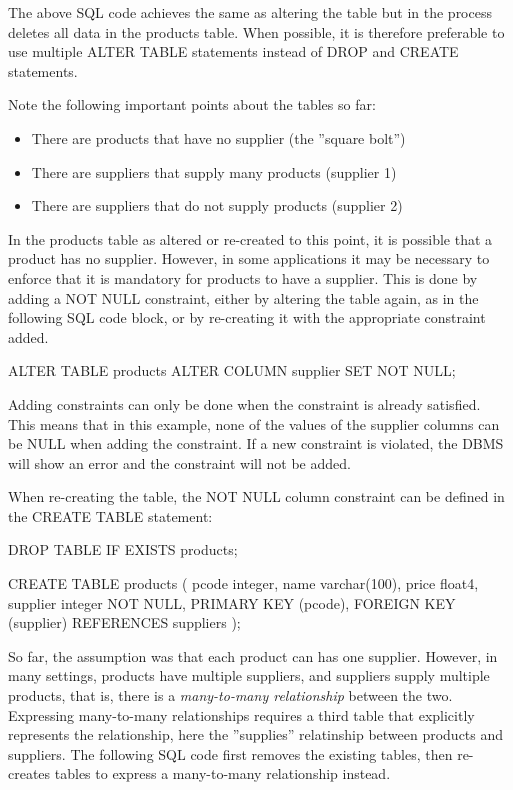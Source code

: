 The above SQL code achieves the same as altering the table but in the process deletes all data in the products table. When possible, it is therefore preferable to use multiple ALTER TABLE statements instead of DROP and CREATE statements. 

Note the following important points about the tables so far:
\begin{itemize}
  \item There are products that have no supplier (the ''square bolt'')
  \item There are suppliers that supply many products (supplier 1)
  \item There are suppliers that do not supply products (supplier 2)
\end{itemize}

In the products table as altered or re-created to this point, it is possible that a product has no supplier. However, in some applications it may be necessary to enforce that it is mandatory for products to have a supplier. This is done by adding a NOT NULL constraint, either by altering the table again, as in the following SQL code block, or by re-creating it with the appropriate constraint added.

\begin{sqlcode}
ALTER TABLE products ALTER COLUMN supplier SET NOT NULL;
\end{sqlcode}

Adding constraints can only be done when the constraint is already satisfied. This means that in this example, none of the values of the supplier columns can be NULL when adding the constraint. If a new constraint is violated, the DBMS will show an error and the constraint will not be added.

When re-creating the table, the NOT NULL column constraint can be defined in the CREATE TABLE statement:

\begin{sqlcode}
DROP TABLE IF EXISTS products;

CREATE TABLE products (
  pcode    integer,
  name     varchar(100),
  price    float4,
  supplier integer NOT NULL,
  PRIMARY KEY (pcode),
  FOREIGN KEY (supplier) REFERENCES suppliers 
);
\end{sqlcode}

So far, the assumption was that each product can has one supplier. However, in many settings, products have multiple suppliers, and suppliers supply multiple products, that is, there is a \emph{many-to-many relationship} between the two. Expressing many-to-many relationships requires a third table that explicitly represents the relationship, here the ''supplies'' relatinship between products and suppliers. The following SQL code first removes the existing tables, then re-creates tables to express a many-to-many relationship instead.

